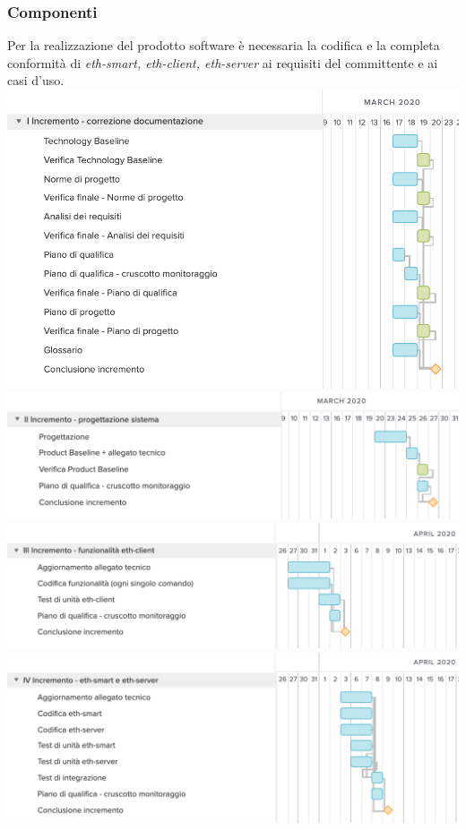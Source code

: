 \subsubsection{Componenti}
Per la realizzazione del prodotto software è necessaria la codifica e la completa conformità di \textit{eth-smart, eth-client, eth-server} ai requisiti del committente e ai casi d'uso.\\
	\includegraphics[width=\textwidth]{res/img/gantt/RQ/1}
	\includegraphics[width=\textwidth]{res/img/gantt/RQ/2}
	\includegraphics[width=\textwidth]{res/img/gantt/RQ/3}
	\includegraphics[width=\textwidth]{res/img/gantt/RQ/4}
